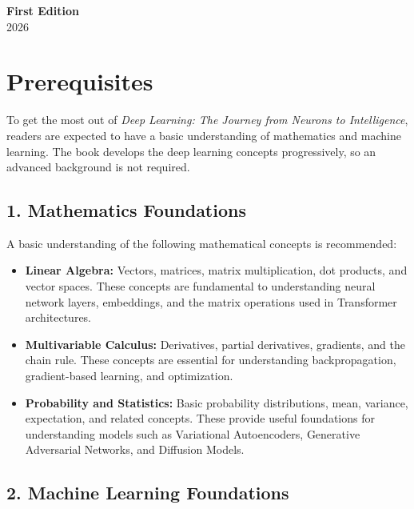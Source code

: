 \documentclass[11pt,a4paper,oneside]{book}
\begin{document}
\vspace{0.8cm}

\begin{center}
    \textbf{First Edition}\\[0.3cm]
    2026\\[0.8cm]
\end{center}

\vspace*{\fill}

\clearpage

\section*{Prerequisites}

To get the most out of \textit{Deep Learning: The Journey from Neurons to Intelligence}, readers are expected to have a basic understanding of mathematics and machine learning. The book develops the deep learning concepts progressively, so an advanced background is not required.

\subsection*{1. Mathematics Foundations}

A basic understanding of the following mathematical concepts is recommended:

\begin{itemize}
    \item \textbf{Linear Algebra:} Vectors, matrices, matrix multiplication, dot products, and vector spaces. These concepts are fundamental to understanding neural network layers, embeddings, and the matrix operations used in Transformer architectures.

    \item \textbf{Multivariable Calculus:} Derivatives, partial derivatives, gradients, and the chain rule. These concepts are essential for understanding backpropagation, gradient-based learning, and optimization.

    \item \textbf{Probability and Statistics:} Basic probability distributions, mean, variance, expectation, and related concepts. These provide useful foundations for understanding models such as Variational Autoencoders, Generative Adversarial Networks, and Diffusion Models.
\end{itemize}

\subsection*{2. Machine Learning Foundations}
\end{document}
